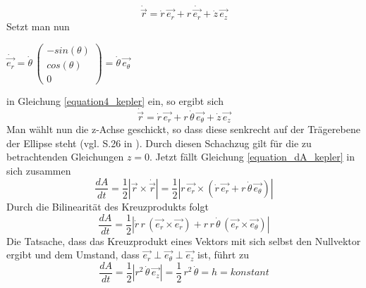 \begin{equation}
	\dot{\vec{r}} = \dot{r}\,\vec{e_r} + r\,\dot{\vec{e_r}} + \dot{z}\,\vec{e_z}
	\label{equation4_kepler}
\end{equation}
Setzt man nun   
\begin{center}	
	\ensuremath{\dot{\vec{e_{r}}}=\dot{\theta}\,\left(\begin{array}{c}-sin(\theta)\\ cos(\theta)\\0\end{array}\right)=\dot{\theta}\,\vec{e_{\theta}}}
\end{center}
in Gleichung \ref{equation4_kepler} ein, so ergibt sich  
\begin{equation}
\dot{\vec{r}} = \dot{r}\,\vec{e_r} + r\,\dot{\theta}\,\vec{e_{\theta}} + \dot{z}\,\vec{e_z}
\label{equation5_kepler}
\end{equation}
Man wählt nun die z-Achse geschickt, so dass diese senkrecht auf der Trägerebene der Ellipse steht (vgl. S.26 in \cite{Raumflugm}). Durch diesen Schachzug gilt für die zu betrachtenden Gleichungen \ensuremath{z=0}. Jetzt fällt Gleichung \ref{equation_dA_kepler} in sich zusammen
\begin{equation}
\frac{dA}{dt} = \frac{1}{2}\left| \vec{r} \times \dot{\vec{r}} \right| = \frac{1}{2}\left| r\,\vec{e_r} \times \left(\dot{r}\,\vec{e_r} + r\,\dot{\theta}\,\vec{e_{\theta}}\right) \right| 
\end{equation}  
Durch die Bilinearität des Kreuzprodukts folgt
\begin{equation}
\frac{dA}{dt} = \frac{1}{2}\left| \dot{r}\,r\,\left(\vec{e_r} \times \vec{e_r}\right) + r\,r\,\dot{\theta}\,\left(\vec{e_r} \times \vec{e_{\theta}}\right) \right| 
\end{equation}
Die Tatsache, dass das Kreuzprodukt eines Vektors mit sich selbst den Nullvektor ergibt und dem Umstand, dass \ensuremath{\vec{e_r}\perp\vec{e_\theta}\perp\vec{e_z}} ist, führt zu
\begin{equation}
\frac{dA}{dt} = \frac{1}{2}\left|r^2\,\dot{\theta}\,\vec{e_z} \right| =  \frac{1}{2}\,r^2\,\dot{\theta}=h=konstant
\label{equation6_kepler}
\end{equation}

